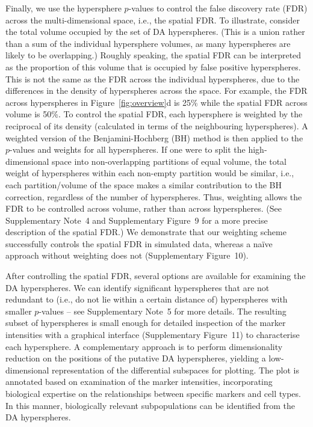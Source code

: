 \documentclass{article}
\newcommand{\suppsecfdr}{4}
\newcommand{\suppsecinterpret}{5}
\newcommand{\suppfigfdrdemo}{9}
\newcommand{\suppfigfdrres}{10}
\newcommand{\suppfiginterpret}{11}
\begin{document}
Finally, we use the hypersphere $p$-values to control the false discovery rate (FDR) across the multi-dimensional space, i.e., the spatial FDR.
To illustrate, consider the total volume occupied by the set of DA hyperspheres.
    (This is a union rather than a sum of the individual hypersphere volumes, as many hyperspheres are likely to be overlapping.)
    Roughly speaking, the spatial FDR can be interpreted as the proportion of this volume that is occupied by false positive hyperspheres.
    This is not the same as the FDR across the individual hyperspheres, due to the differences in the density of hyperspheres across the space.
    For example, the FDR across hyperspheres in Figure~\ref{fig:overview}d is 25\% while the spatial FDR across volume is 50\%.
To control the spatial FDR, each hypersphere is weighted by the reciprocal of its density (calculated in terms of the neighbouring hyperspheres).
    A weighted version of the Benjamini-Hochberg (BH) method \cite{benjamini1997multiple} is then applied to the $p$-values and weights for all hyperspheres.
    If one were to split the high-dimensional space into non-overlapping partitions of equal volume, the total weight of hyperspheres within each non-empty partition would be similar, i.e., each partition/volume of the space makes a similar contribution to the BH correction, regardless of the number of hyperspheres.
    Thus, weighting allows the FDR to be controlled across volume, rather than across hyperspheres.
(See Supplementary Note~\suppsecfdr{} and Supplementary Figure~\suppfigfdrdemo{} for a more precise description of the spatial FDR.)
We demonstrate that our weighting scheme successfully controls the spatial FDR in simulated data, whereas a na\"ive approach without weighting does not (Supplementary Figure~\suppfigfdrres{}).

After controlling the spatial FDR, several options are available for examining the DA hyperspheres.
We can identify significant hyperspheres that are not redundant to (i.e., do not lie within a certain distance of) hyperspheres with smaller $p$-values -- see Supplementary Note~\suppsecinterpret{} for more details.
The resulting subset of hyperspheres is small enough for detailed inspection of the marker intensities with a graphical interface (Supplementary Figure~\suppfiginterpret{}) to characterise each hypersphere.
A complementary approach is to perform dimensionality reduction on the positions of the putative DA hyperspheres, yielding a low-dimensional representation of the differential subspaces for plotting.
The plot is annotated based on examination of the marker intensities, incorporating biological expertise on the relationships between specific markers and cell types.
In this manner, biologically relevant subpopulations can be identified from the DA hyperspheres.
\end{document}
